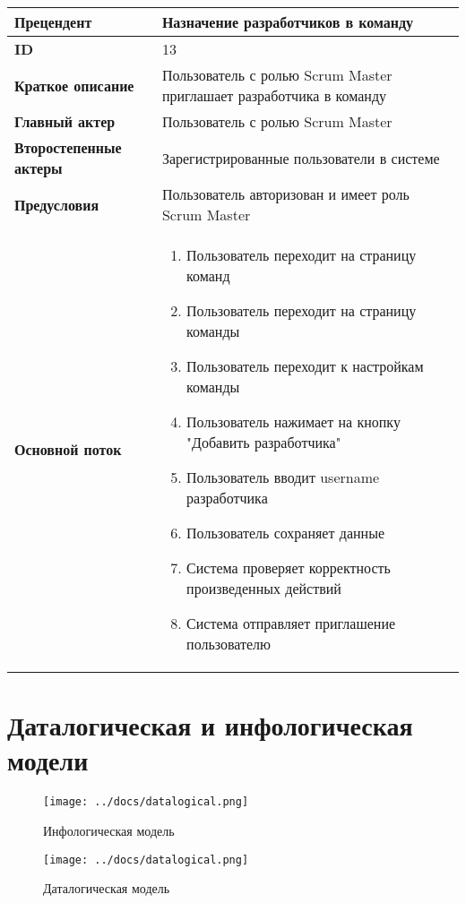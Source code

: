 \documentclass[14pt,a4paper]{extarticle}
\begin{document}
\begin{tabular}{|l|p{9cm}|}
	\hline
	\textbf{Прецендент}            & Назначение разработчиков в команду                                  \\
	\hline
	\textbf{ID}                    & 13                                                                  \\
	\hline
	\textbf{Краткое описание}      & Пользователь с ролью Scrum Master приглашает разработчика в команду \\
	\hline
	\textbf{Главный актер}         & Пользователь с ролью Scrum Master                                   \\
	\hline
	\textbf{Второстепенные актеры} & Зарегистрированные пользователи в системе                           \\
	\hline
	\textbf{Предусловия}           & Пользователь авторизован и имеет роль Scrum Master                  \\
	\hline
	\textbf{Основной поток}        & \begin{enumerate}
		                                 \item Пользователь переходит на страницу команд
		                                 \item Пользователь переходит на страницу команды
		                                 \item Пользователь переходит к настройкам команды
		                                 \item Пользователь нажимает на кнопку "Добавить разработчика"
		                                 \item Пользователь вводит username разработчика
		                                 \item Пользователь сохраняет данные
		                                 \item Система проверяет корректность произведенных действий
		                                 \item Система отправляет приглашение пользователю
	                                 \end{enumerate}        \\
	\hline
\end{tabular}

\section{Даталогическая и инфологическая модели}

\begin{figure}[h!]
  \centering
  \texttt{[image: ../docs/datalogical.png]}
  \caption{Инфологическая модель}
\end{figure}

\begin{figure}[h!]
  \centering
  \texttt{[image: ../docs/datalogical.png]}
  \caption{Даталогическая модель}
\end{figure}
\clearpage

\printnoidxglossaries
\end{document}
